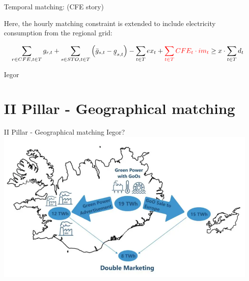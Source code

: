 \begin{frame}{Temporal matching: (CFE story)}

  Here, the \alert{hourly matching} constraint is extended to include electricity consumption from the regional grid:

  \vspace{0.1cm}
  \begin{equation}
  \sum_{r\in CFE, t\in T} g_{r,t} + \sum_{s\in STO, t\in T} \left(\bar{g}_{s,t} - \ubar{g}_{s,t}\right) - \sum_{t\in T} ex_t + \textcolor{red}{\sum_{t\in T} CFE_t \cdot im_t} \geq x \cdot \sum_{t\in T} d_t
  \label{eqn:CFE}
  \end{equation}
  \vspace{0.1cm}

  \noindent{}
  Iegor

\end{frame}


\section{II Pillar - Geographical matching}
\begin{frame}{II Pillar - Geographical matching}
  Iegor?
  \includegraphics[width=13cm]{images/go_leak.png}
\end{frame}



